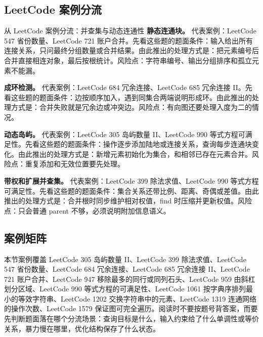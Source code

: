 \subsection{LeetCode 案例分流}

\begin{principlebox}{从 LeetCode 案例分流：并查集与动态连通性}
\textbf{静态连通块。}
代表案例：LeetCode 547 省份数量、LeetCode 721 账户合并。先看这些题的题面条件：输入给出所有连接关系，只问最终分组数量或合并结果。由此推出的处理方式是：把元素编号后合并直接相连对象，最后按根统计。风险点：字符串编号、输出分组排序和孤立元素不能漏。

\textbf{成环检测。}
代表案例：LeetCode 684 冗余连接、LeetCode 685 冗余连接 II。先看这些题的题面条件：边按顺序加入，遇到同集合两端说明形成环。由此推出的处理方式是：合并失败就是冗余边或冲突边。风险点：有向图还要处理入度为二的情况。

\textbf{动态岛屿。}
代表案例：LeetCode 305 岛屿数量 II、LeetCode 990 等式方程可满足性。先看这些题的题面条件：操作逐步添加陆地或连接关系，查询每步连通块变化。由此推出的处理方式是：新增元素初始化为集合，和相邻已存在元素合并。风险点：重复添加和无效位置要先处理。

\textbf{带权和扩展并查集。}
代表案例：LeetCode 399 除法求值、LeetCode 990 等式方程可满足性。先看这些题的题面条件：集合关系还带比例、距离、奇偶或差值。由此推出的处理方式是：合并根时同步维护相对权值，find 时压缩并更新权值。风险点：只会普通 parent 不够，必须说明附加信息语义。

\end{principlebox}

\subsection{案例矩阵}

本节案例覆盖 LeetCode 305 岛屿数量 II、LeetCode 399 除法求值、LeetCode 547 省份数量、LeetCode 684 冗余连接、LeetCode 685 冗余连接 II、LeetCode 721 账户合并、LeetCode 947 移除最多的同行或同列石头、LeetCode 959 由斜杠划分区域、LeetCode 990 等式方程的可满足性、LeetCode 1061 按字典序排列最小的等效字符串、LeetCode 1202 交换字符串中的元素、LeetCode 1319 连通网络的操作次数、LeetCode 1579 保证图可完全遍历。阅读时不要按题号背答案，而要先判断题面落在哪个分流场景：查询目标是什么，输入约束给了什么单调性或等价关系，暴力慢在哪里，优化结构保存了什么状态。

